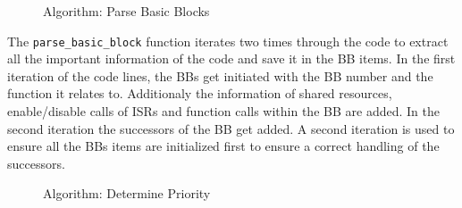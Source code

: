 \documentclass[
fancyheadings, %
%
%
]{stsreprt}
\begin{document}
{\begin{figure}[H]
{\begin{algorithm}[H]
					
					
					\;
				\end{algorithm}
				
			}
			\caption{Algorithm: Parse Basic Blocks}
		\end{figure}
		\vspace{1cm}
		The \texttt{parse\_basic\_block} function iterates two times through the code to extract all the important information of the code and save it in the \ac{BB} items. In the first iteration of the code lines, the \acp{BB} get initiated with the \ac{BB} number and the function it relates to. Additionaly the information of shared resources, enable/disable calls of \acp{ISR} and function calls within the \ac{BB} are added.
		In the second iteration the successors of the \ac{BB} get added. A second iteration is used to ensure all the \acp{BB} items are initialized first to ensure a correct handling of the successors.
		
		\begin{figure}[H]
			\centering
			\caption{Algorithm: Determine Priority}
		\end{figure} 
		
}
\end{document}
